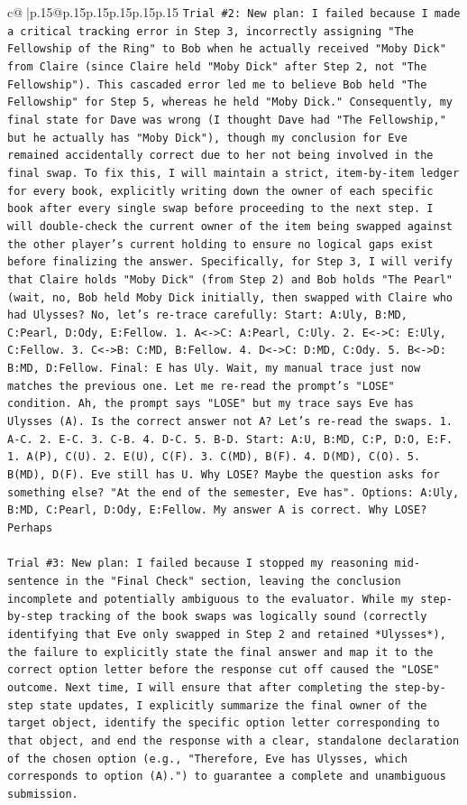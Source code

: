 \documentclass{article}
\begin{document}
{\begin{supertabular}{c@{$\;$}|p{.15\linewidth}@{}p{.15\linewidth}p{.15\linewidth}p{.15\linewidth}p{.15\linewidth}p{.15\linewidth}}
{{{\texttt{Trial \#2: New plan: I failed because I made a critical tracking error in Step 3, incorrectly assigning "The Fellowship of the Ring" to Bob when he actually received "Moby Dick" from Claire (since Claire held "Moby Dick" after Step 2, not "The Fellowship"). This cascaded error led me to believe Bob held "The Fellowship" for Step 5, whereas he held "Moby Dick." Consequently, my final state for Dave was wrong (I thought Dave had "The Fellowship," but he actually has "Moby Dick"), though my conclusion for Eve remained accidentally correct due to her not being involved in the final swap. To fix this, I will maintain a strict, item{-}by{-}item ledger for every book, explicitly writing down the owner of each specific book after every single swap before proceeding to the next step. I will double{-}check the current owner of the item being swapped against the other player's current holding to ensure no logical gaps exist before finalizing the answer. Specifically, for Step 3, I will verify that Claire holds "Moby Dick" (from Step 2) and Bob holds "The Pearl" (wait, no, Bob held Moby Dick initially, then swapped with Claire who had Ulysses? No, let's re{-}trace carefully: Start: A:Uly, B:MD, C:Pearl, D:Ody, E:Fellow. 1. A<{-}>C: A:Pearl, C:Uly. 2. E<{-}>C: E:Uly, C:Fellow. 3. C<{-}>B: C:MD, B:Fellow. 4. D<{-}>C: D:MD, C:Ody. 5. B<{-}>D: B:MD, D:Fellow. Final: E has Uly. Wait, my manual trace just now matches the previous one. Let me re{-}read the prompt's "LOSE" condition. Ah, the prompt says "LOSE" but my trace says Eve has Ulysses (A). Is the correct answer not A? Let's re{-}read the swaps. 1. A{-}C. 2. E{-}C. 3. C{-}B. 4. D{-}C. 5. B{-}D. Start: A:U, B:MD, C:P, D:O, E:F. 1. A(P), C(U). 2. E(U), C(F). 3. C(MD), B(F). 4. D(MD), C(O). 5. B(MD), D(F). Eve still has U. Why LOSE? Maybe the question asks for something else? "At the end of the semester, Eve has". Options: A:Uly, B:MD, C:Pearl, D:Ody, E:Fellow. My answer A is correct. Why LOSE? Perhaps} \\
\\ 
\texttt{Trial \#3: New plan: I failed because I stopped my reasoning mid{-}sentence in the "Final Check" section, leaving the conclusion incomplete and potentially ambiguous to the evaluator. While my step{-}by{-}step tracking of the book swaps was logically sound (correctly identifying that Eve only swapped in Step 2 and retained *Ulysses*), the failure to explicitly state the final answer and map it to the correct option letter before the response cut off caused the "LOSE" outcome. Next time, I will ensure that after completing the step{-}by{-}step state updates, I explicitly summarize the final owner of the target object, identify the specific option letter corresponding to that object, and end the response with a clear, standalone declaration of the chosen option (e.g., "Therefore, Eve has Ulysses, which corresponds to option (A).") to guarantee a complete and unambiguous submission.} \\
}}}
\end{supertabular}}
\end{document}
